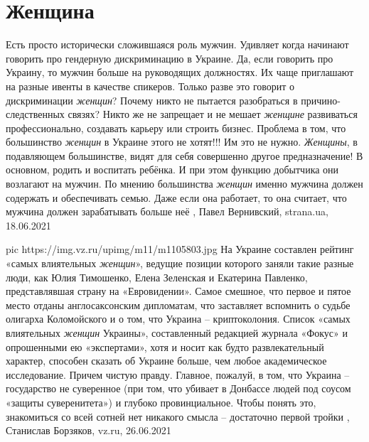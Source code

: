  
 
 
 
 
\chapter{Женщина}
\label{sec:slova.zhenschina}

Есть просто исторически сложившаяся роль мужчин.  Удивляет когда начинают
говорить про гендерную дискриминацию в Украине.  Да, если говорить про Украину,
то мужчин больше на руководящих должностях. Их чаще приглашают на разные ивенты
в качестве спикеров.  Только разве это говорит о дискриминации \emph{женщин}?
Почему никто не пытается разобраться в причино-следственных связях?  Никто же
не запрещает и не мешает \emph{женщине} развиваться профессионально, создавать
карьеру или строить бизнес.  Проблема в том, что большинство \emph{женщин} в
Украине этого не хотят!!! Им это не нужно. \emph{Женщины}, в подавляющем
большинстве, видят для себя совершенно другое предназначение! В основном,
родить и воспитать ребёнка.  И при этом функцию добытчика они возлагают на
мужчин. По мнению большинства \emph{женщин} именно мужчина должен содержать и
обеспечивать семью. Даже если она работает, то она считает, что мужчина должен
зарабатывать больше неё
, 
Павел Вернивский, strana.ua, 18.06.2021

\ifcmt
  pic https://img.vz.ru/upimg/m11/m1105803.jpg
\fi
На Украине составлен рейтинг «самых влиятельных \emph{женщин}», ведущие позиции
которого заняли такие разные люди, как Юлия Тимошенко, Елена Зеленская и
Екатерина Павленко, представлявшая страну на «Евровидении». Самое смешное, что
первое и пятое место отданы англосаксонским дипломатам, что заставляет
вспомнить о судьбе олигарха Коломойского и о том, что Украина – криптоколония.
Список «самых влиятельных \emph{женщин} Украины», составленный редакцией журнала
«Фокус» и опрошенными ею «экспертами», хотя и носит как будто развлекательный
характер, способен сказать об Украине больше, чем любое академическое
исследование. Причем чистую правду.  Главное, пожалуй, в том, что Украина –
государство не суверенное (при том, что убивает в Донбассе людей под соусом
«защиты суверенитета») и глубоко провинциальное. Чтобы понять это, знакомиться
со всей сотней нет никакого смысла – достаточно первой тройки
, 
Станислав Борзяков, vz.ru, 26.06.2021
